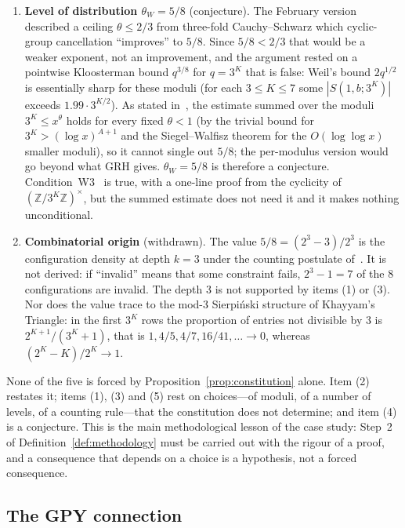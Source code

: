 \documentclass[12pt]{amsart}
\theoremstyle{plain}
\theoremstyle{definition}
\theoremstyle{remark}
\begin{document}
\begin{enumerate}[label=(\arabic*)]
  \item \textbf{Level of distribution $\theta_W = 5/8$} (conjecture). The
    February version described a ceiling $\theta \leq 2/3$ from three-fold
    Cauchy--Schwarz which cyclic-group cancellation ``improves'' to $5/8$.
    Since $5/8 < 2/3$ that would be a weaker exponent, not an improvement, and
    the argument rested on a pointwise Kloosterman bound $q^{3/8}$ for
    $q = 3^K$ that is false: Weil's bound $2q^{1/2}$ is essentially sharp for
    these moduli (for each $3 \leq K \leq 7$ some $|S(1,b;3^K)|$ exceeds
    $1.99 \cdot 3^{K/2}$). As
    stated in~\cite{WakilEisenstein}, the estimate summed over the moduli
    $3^K \leq x^{\theta}$ holds for every fixed $\theta < 1$ (by the trivial
    bound for $3^K > (\log x)^{A+1}$ and the Siegel--Walfisz theorem for the
    $O(\log\log x)$ smaller moduli), so it cannot single out $5/8$; the per-modulus version would go
    beyond what GRH gives. $\theta_W = 5/8$ is therefore a conjecture.
    Condition~W3~\cite{WakilW3} is true, with a one-line proof from the
    cyclicity of $(\mathbb{Z}/3^K\mathbb{Z})^\times$, but the summed estimate
    does not need it and it makes nothing unconditional.

  \item \textbf{Combinatorial origin} (withdrawn). The value
    $5/8 = (2^3 - 3)/2^3$ is the configuration density at depth $k = 3$ under
    the counting postulate of~\cite{WakilCF,WakilRamanujan}. It is not derived:
    if ``invalid'' means that some constraint fails, $2^3 - 1 = 7$ of the $8$
    configurations are invalid. The depth $3$ is not supported by items (1) or
    (3). Nor does the value trace to the mod-$3$ Sierpi\'nski structure of
    Khayyam's Triangle: in the first $3^K$ rows the proportion of entries not
    divisible by $3$ is $2^{K+1}/(3^K + 1)$, that is
    $1, 4/5, 4/7, 16/41, \ldots \to 0$, whereas $(2^K - K)/2^K \to 1$.
\end{enumerate}

None of the five is forced by Proposition~\ref{prop:constitution} alone. Item
(2) restates it; items (1), (3) and (5) rest on choices---of moduli, of a
number of levels, of a counting rule---that the constitution does not
determine; and item (4) is a conjecture. This is the main methodological lesson
of the case study: Step~2 of Definition~\ref{def:methodology} must be carried
out with the rigour of a proof, and a consequence that depends on a choice is a
hypothesis, not a forced consequence.

\subsection{The GPY connection}
\label{sec:gpy}
\end{document}
